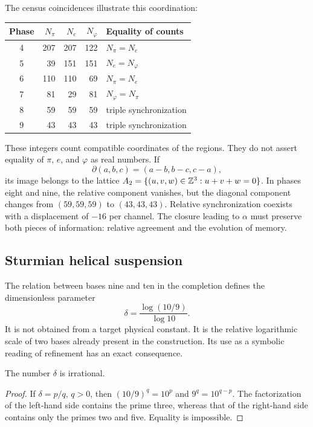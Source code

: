 The census coincidences illustrate this coordination:
\begin{center}
\begin{tabular}{@{}c rrr l@{}}\toprule
Phase&\(N_\pi\)&\(N_e\)&\(N_\varphi\)&Equality of counts\\\midrule
4&207&207&122&\(N_\pi=N_e\)\\
5&39&151&151&\(N_e=N_\varphi\)\\
6&110&110&69&\(N_\pi=N_e\)\\
7&81&29&81&\(N_\varphi=N_\pi\)\\
8&59&59&59&triple synchronization\\
9&43&43&43&triple synchronization\\\bottomrule
\end{tabular}
\end{center}
These integers count compatible coordinates of the regions. They do not assert equality of \(\pi\), \(e\), and \(\varphi\) as real numbers. If
\[
 \partial(a,b,c)=(a-b,b-c,c-a),
\]
its image belongs to the lattice \(A_2=\{(u,v,w)\in\mathbb Z^3:u+v+w=0\}\). In phases eight and nine, the relative component vanishes, but the diagonal component changes from \((59,59,59)\) to \((43,43,43)\). Relative synchronization coexists with a displacement of \(-16\) per channel. The closure leading to \(\alpha\) must preserve both pieces of information: relative agreement and the evolution of memory.

\subsection{Sturmian helical suspension}

The relation between bases nine and ten in the completion defines the dimensionless parameter
\begin{equation}
 \delta=\frac{\log(10/9)}{\log10}.
 \label{eq:delta-sturm}
\end{equation}
It is not obtained from a target physical constant. It is the relative logarithmic scale of two bases already present in the construction. Its use as a symbolic reading of refinement has an exact consequence.

\begin{lemma}
The number \(\delta\) is irrational.
\end{lemma}
\begin{proof}
If \(\delta=p/q\), \(q>0\), then \((10/9)^q=10^p\) and \(9^q=10^{q-p}\). The factorization of the left-hand side contains the prime three, whereas that of the right-hand side contains only the primes two and five. Equality is impossible.
\end{proof}

